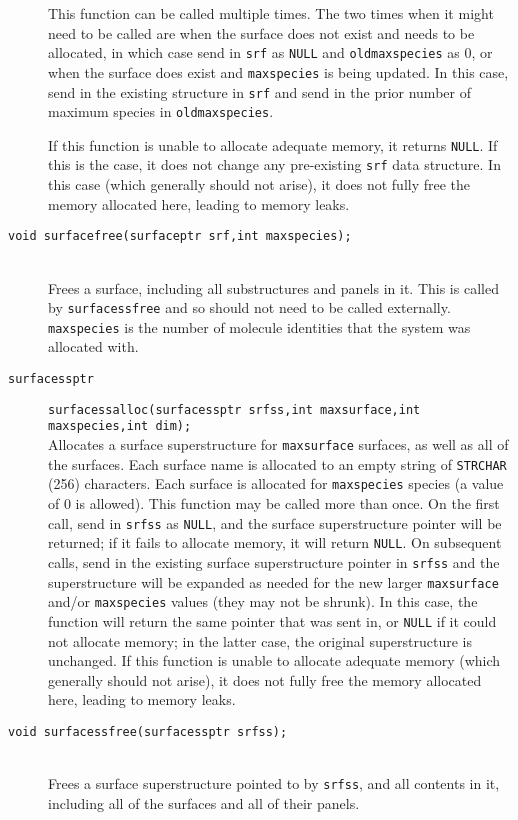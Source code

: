 \documentclass {scrbook}
\newcommand {\ttt} {\texttt}
\begin{document}
\begin{description}
This function can be called multiple times. The two times when it might need to be called are when the surface does not exist and needs to be allocated, in which case send in \ttt{srf} as \ttt{NULL} and \ttt{oldmaxspecies} as 0, or when the surface does exist and \ttt{maxspecies} is being updated. In this case, send in the existing structure in \ttt{srf} and send in the prior number of maximum species in \ttt{oldmaxspecies}.

If this function is unable to allocate adequate memory, it returns \ttt{NULL}. If this is the case, it does not change any pre-existing \ttt{srf} data structure. In this case (which generally should not arise), it does not fully free the memory allocated here, leading to memory leaks.

\item[\ttt{void surfacefree(surfaceptr srf,int maxspecies);}]
\hfill \\
Frees a surface, including all substructures and panels in it. This is called by \ttt{surfacessfree} and so should not need to be called externally. \ttt{maxspecies} is the number of molecule identities that the system was allocated with.

\item[\ttt{surfacessptr}]
\ttt{surfacessalloc(surfacessptr srfss,int maxsurface,int maxspecies,int dim);}
\hfill \\
Allocates a surface superstructure for \ttt{maxsurface} surfaces, as well as all of the surfaces. Each surface name is allocated to an empty string of \ttt{STRCHAR} (256) characters. Each surface is allocated for \ttt{maxspecies} species (a value of 0 is allowed). This function may be called more than once. On the first call, send in \ttt{srfss} as \ttt{NULL}, and the surface superstructure pointer will be returned; if it fails to allocate memory, it will return \ttt{NULL}. On subsequent calls, send in the existing surface superstructure pointer in \ttt{srfss} and the superstructure will be expanded as needed for the new larger \ttt{maxsurface} and/or \ttt{maxspecies} values (they may not be shrunk). In this case, the function will return the same pointer that was sent in, or \ttt{NULL} if it could not allocate memory; in the latter case, the original superstructure is unchanged. If this function is unable to allocate adequate memory (which generally should not arise), it does not fully free the memory allocated here, leading to memory leaks.

\item[\ttt{void surfacessfree(surfacessptr srfss);}]
\hfill \\
Frees a surface superstructure pointed to by \ttt{srfss}, and all contents in it, including all of the surfaces and all of their panels.


\end{description}
\end{document}
